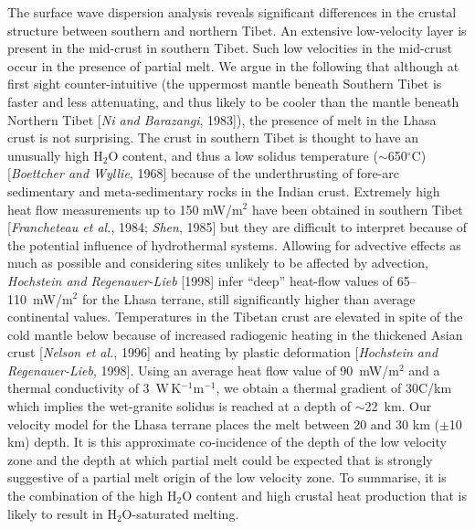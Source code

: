 \documentclass[12pt]{article}
\begin{document}
The surface wave dispersion analysis reveals significant differences in the crustal structure between
southern and northern Tibet.
An extensive low-velocity layer is present in the mid-crust in southern Tibet.
Such low velocities in the mid-crust occur in the presence of partial
melt.   We argue in the following that
although at first sight
counter-intuitive (the uppermost mantle beneath Southern Tibet is
faster and less attenuating, and thus likely to be cooler than the
mantle beneath Northern Tibet [{\it Ni and Barazangi}, 1983]), the
presence of melt in the Lhasa crust is not surprising.
 The crust in southern Tibet is thought to have an unusually
high H$_2$O content, and thus a low solidus temperature ($\sim$650$^\circ$C) [{\it Boettcher and Wyllie},
1968] because of the
underthrusting of fore-arc sedimentary and meta-sedimentary rocks in the Indian crust.
Extremely high heat flow measurements up to 150 mW/m$^2$ have been
obtained in southern Tibet [{\it Francheteau et al.}, 1984; {\it
Shen}, 1985] but they are difficult to interpret
because of the potential influence of hydrothermal systems.  Allowing
for advective effects as much as possible and considering sites
unlikely to be affected by advection, {\it Hochstein and
Regenauer-Lieb} [1998] infer ``deep'' heat-flow values of
65--110~mW/m$^2$ for the Lhasa terrane, still significantly higher than average
continental values. Temperatures in the Tibetan crust are elevated in spite of the cold
mantle below because of
increased radiogenic heating in the thickened Asian crust [{\it Nelson
et al.}, 1996] and heating by plastic deformation [{\it Hochstein
and Regenauer-Lieb}, 1998].  Using an average heat flow value of
90~mW/m$^2$ and a thermal conductivity of 3~W\,K$^{-1}$m$^{-1}$, we
obtain a thermal gradient of 30\dg C/km which implies the wet-granite
solidus is reached at a depth of $\sim$22~km.
 Our
velocity model for the Lhasa terrane places the melt between 20 and 30
km ($\pm$10 km) depth.  It is this approximate co-incidence of
the depth of the low velocity zone and the depth at which partial melt
could be expected that is strongly suggestive of a partial melt origin
of the low velocity zone.
To summarise, it is the combination of the high H$_2$O content and
high crustal heat production that is likely to result
in H$_2$O-saturated melting.
\end{document}
